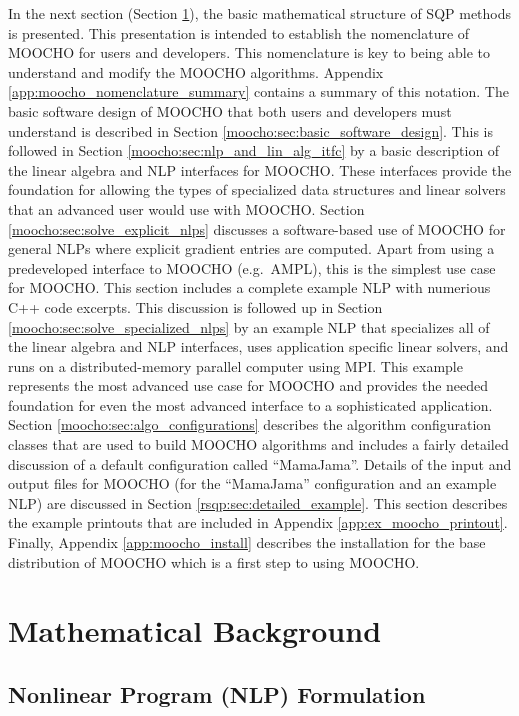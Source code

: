 \documentclass[pdf,ps2pdf,11pt]{SANDreport}
\begin{document}
In the next section (Section {}\ref{moocho:sec:sqp_background}), the basic
mathematical structure of SQP methods is presented.  This presentation is
intended to establish the nomenclature of MOOCHO for users and developers.
This nomenclature is key to being able to understand and modify the MOOCHO
algorithms.  Appendix {}\ref{app:moocho_nomenclature_summary} contains a
summary of this notation.  The basic software design of MOOCHO that both users
and developers must understand is described in Section
{}\ref{moocho:sec:basic_software_design}.  This is followed in Section
{}\ref{moocho:sec:nlp_and_lin_alg_itfc} by a basic description of the linear
algebra and NLP interfaces for MOOCHO.  These interfaces provide the
foundation for allowing the types of specialized data structures and linear
solvers that an advanced user would use with MOOCHO.  Section
{}\ref{moocho:sec:solve_explicit_nlps} discusses a software-based use of
MOOCHO for general NLPs where explicit gradient entries are computed.  Apart
from using a predeveloped interface to MOOCHO (e.g.\ AMPL), this is the
simplest use case for MOOCHO.  This section includes a complete example NLP
with numerious C++ code excerpts.  This discussion is followed up in Section
{}\ref{moocho:sec:solve_specialized_nlps} by an example NLP that specializes
all of the linear algebra and NLP interfaces, uses application specific linear
solvers, and runs on a distributed-memory parallel computer using MPI.  This
example represents the most advanced use case for MOOCHO and provides the
needed foundation for even the most advanced interface to a sophisticated
application.  Section {}\ref{moocho:sec:algo_configurations} describes the
algorithm configuration classes that are used to build MOOCHO algorithms and
includes a fairly detailed discussion of a default configuration called
``MamaJama''.  Details of the input and output files for MOOCHO (for the
``MamaJama'' configuration and an example NLP) are discussed in Section
{}\ref{rsqp:sec:detailed_example}. This section describes the example
printouts that are included in Appendix {}\ref{app:ex_moocho_printout}.
Finally, Appendix {}\ref{app:moocho_install} describes the installation for
the base distribution of MOOCHO which is a first step to using MOOCHO.

%
\section{Mathematical Background}
\label{moocho:sec:sqp_background}
%

%
\subsection{Nonlinear Program (NLP) Formulation}
\label{moocho:sec:nlp_formulation}
%
\end{document}
